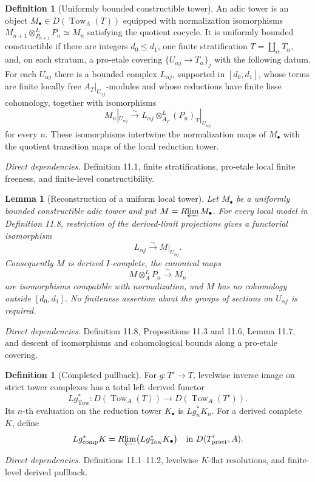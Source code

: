 \documentclass[10pt]{article}
\newtheorem{lemma}[theorem]{Lemma}
\theoremstyle{definition}
\newtheorem{definition}[theorem]{Definition}
\newcommand{\Rlim}{R\!\varprojlim}
\newcommand{\Proet}{\mathrm{proet}}
\newcommand{\deps}[1]{\par\smallskip\textit{Direct dependencies.} #1\par}
\begin{document}
\begin{definition}[Uniformly bounded constructible tower]
An adic tower is an object $M_\bullet\in
D(\operatorname{Tow}_{A}(T))$ equipped with normalization isomorphisms
$M_{n+1}\otimes^L_{P_{n+1}}P_n\simeq M_n$ satisfying the quotient
cocycle.  It is uniformly bounded constructible if there are integers
$d_0\leq d_1$, one finite stratification $T=\coprod_\alpha T_\alpha$, and,
on each stratum, a pro-etale covering $\{U_{\alpha j}\to T_\alpha\}_j$
with the following datum.  For each $U_{\alpha j}$ there is a bounded
complex $L_{\alpha j}$, supported in $[d_0,d_1]$, whose terms are finite
locally free $A_T|_{U_{\alpha j}}$-modules and whose reductions have finite
lisse cohomology, together with isomorphisms
\[
 M_n|_{U_{\alpha j}}\xrightarrow{\sim}
 L_{\alpha j}\otimes^L_{A_T}(P_n)_T|_{U_{\alpha j}}
\]
for every $n$.  These isomorphisms intertwine the normalization maps of
$M_\bullet$ with the quotient transition maps of the local reduction
tower.
\end{definition}
\deps{Definition 11.1, finite stratifications, pro-etale local finite
freeness, and finite-level constructibility.}

\begin{lemma}[Reconstruction of a uniform local tower]
Let $M_\bullet$ be a uniformly bounded constructible adic tower and put
$M=\Rlim M_\bullet$.  For every local model in Definition 11.8,
restriction of the derived-limit projections gives a functorial
isomorphism
\[
 L_{\alpha j}\xrightarrow{\sim}M|_{U_{\alpha j}}.
\]
Consequently $M$ is derived $I$-complete, the canonical maps
\[
 M\otimes_A^LP_n\xrightarrow{\sim}M_n
\]
are isomorphisms compatible with normalization, and $M$ has no cohomology
outside $[d_0,d_1]$.  No finiteness assertion about the groups of sections
on $U_{\alpha j}$ is required.
\end{lemma}
\deps{Definition 11.8, Propositions 11.3 and 11.6, Lemma 11.7, and descent
of isomorphisms and cohomological bounds along a pro-etale covering.}

\begin{definition}[Completed pullback]
For $g:T'\to T$, levelwise inverse image on strict tower complexes has a
total left derived functor
\[
 Lg^*_{\operatorname{Tow}}:
 D(\operatorname{Tow}_{A}(T))
 \longrightarrow D(\operatorname{Tow}_{A}(T')).
\]
Its $n$-th evaluation on the reduction tower $K_\bullet$ is
$Lg_n^*K_n$.  For a derived complete $K$, define
\[
 Lg^*_{\mathrm{comp}}K
   =\Rlim\bigl(Lg^*_{\operatorname{Tow}}K_\bullet\bigr)
 \quad\text{in }D(T'_{\Proet},A).
\]
\end{definition}
\deps{Definitions 11.1--11.2, levelwise $K$-flat resolutions, and
finite-level derived pullback.}
\end{document}
